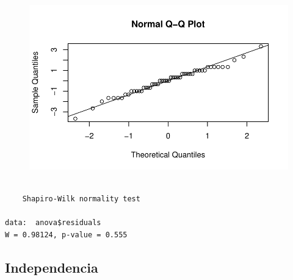 \documentclass[
  letterpaper,
  DIV=11,
  numbers=noendperiod]{scrartcl}
\newenvironment{Shaded}{\begin{snugshade}}{\end{snugshade}}
\newcommand{\FunctionTok}[1]{\textcolor[rgb]{0.28,0.35,0.67}{#1}}
\newcommand{\NormalTok}[1]{\textcolor[rgb]{0.00,0.23,0.31}{#1}}
\newcommand{\SpecialCharTok}[1]{\textcolor[rgb]{0.37,0.37,0.37}{#1}}
\begin{document}
\begin{figure}[H]

{\centering \includegraphics{fatorial_multi_files/figure-pdf/unnamed-chunk-5-1.pdf}

}

\end{figure}

\begin{Shaded}
\end{Shaded}

\begin{verbatim}

    Shapiro-Wilk normality test

data:  anova$residuals
W = 0.98124, p-value = 0.555
\end{verbatim}

\hypertarget{independencia}{%
\subsection{Independencia}\label{independencia}}

\begin{Shaded}
\end{Shaded}
\end{document}

